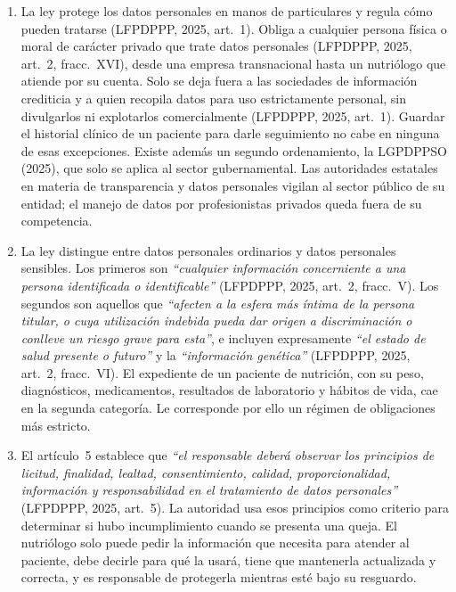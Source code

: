 \documentclass[12pt, a4paper]{article}
\begin{document}
\begin{enumerate}[label=\Roman*.]
  \item La ley protege los datos personales en manos de
  particulares y regula cómo pueden tratarse (LFPDPPP, 2025,
  art.~1). Obliga a cualquier persona física o moral de carácter
  privado que trate datos personales (LFPDPPP, 2025, art.~2,
  fracc.~XVI), desde una empresa transnacional hasta un nutriólogo
  que atiende por su cuenta. Solo se deja fuera a las sociedades de
  información crediticia y a quien recopila datos para uso
  estrictamente personal, sin divulgarlos ni explotarlos
  comercialmente (LFPDPPP, 2025, art.~1). Guardar el historial
  clínico de un paciente para darle seguimiento no cabe en ninguna
  de esas excepciones. Existe además un segundo
  ordenamiento, la LGPDPPSO (2025), que solo se aplica
  al sector gubernamental. Las autoridades estatales en materia de
  transparencia y datos personales vigilan al sector público de su
  entidad; el manejo de datos por profesionistas privados queda
  fuera de su competencia.
 
  \item La ley distingue entre datos personales ordinarios y datos
  personales sensibles. Los primeros son \textit{``cualquier
  información concerniente a una persona identificada o
  identificable''} (LFPDPPP, 2025, art.~2, fracc.~V). Los
  segundos son aquellos que \textit{``afecten a la esfera más
  íntima de la persona titular, o cuya utilización indebida
  pueda dar origen a discriminación o conlleve un riesgo grave
  para esta''}, e incluyen expresamente \textit{``el estado
  de salud presente o futuro''} y la \textit{``información
  genética''} (LFPDPPP, 2025, art.~2, fracc.~VI). El expediente
  de un paciente de nutrición, con su peso, diagnósticos,
  medicamentos, resultados de laboratorio y hábitos de vida, cae en
  la segunda categoría. Le corresponde por ello un régimen de
  obligaciones más estricto.
 
  \item El artículo~5 establece que \textit{``el responsable deberá
  observar los principios de licitud, finalidad, lealtad,
  consentimiento, calidad, proporcionalidad, información y
  responsabilidad en el tratamiento de datos personales''}
  (LFPDPPP, 2025, art.~5). La autoridad usa esos principios como
  criterio para determinar si hubo incumplimiento cuando se presenta
  una queja. El nutriólogo solo puede pedir la
  información que necesita para atender al paciente, debe decirle
  para qué la usará, tiene que mantenerla actualizada y correcta, y
  es responsable de protegerla mientras esté bajo su resguardo.
 

\end{enumerate}
\end{document}
